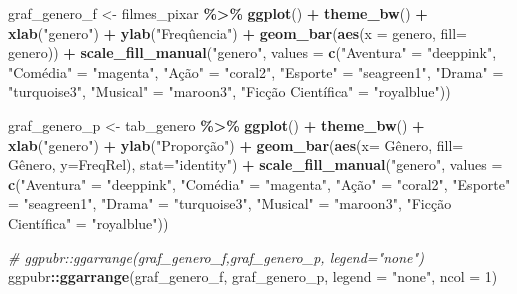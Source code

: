\documentclass[
]{book}
\newenvironment{Shaded}{\begin{snugshade}}{\end{snugshade}}
\newcommand{\AttributeTok}[1]{\textcolor[rgb]{0.13,0.29,0.53}{#1}}
\newcommand{\CommentTok}[1]{\textcolor[rgb]{0.56,0.35,0.01}{\textit{#1}}}
\newcommand{\DecValTok}[1]{\textcolor[rgb]{0.00,0.00,0.81}{#1}}
\newcommand{\FunctionTok}[1]{\textcolor[rgb]{0.13,0.29,0.53}{\textbf{#1}}}
\newcommand{\NormalTok}[1]{#1}
\newcommand{\OtherTok}[1]{\textcolor[rgb]{0.56,0.35,0.01}{#1}}
\newcommand{\SpecialCharTok}[1]{\textcolor[rgb]{0.81,0.36,0.00}{\textbf{#1}}}
\newcommand{\StringTok}[1]{\textcolor[rgb]{0.31,0.60,0.02}{#1}}
\begin{document}
\begin{Shaded}
\begin{Highlighting}[]
\NormalTok{graf\_genero\_f }\OtherTok{\textless{}{-}}\NormalTok{ filmes\_pixar }\SpecialCharTok{\%\textgreater{}\%} 
  \FunctionTok{ggplot}\NormalTok{() }\SpecialCharTok{+} \FunctionTok{theme\_bw}\NormalTok{() }\SpecialCharTok{+} \FunctionTok{xlab}\NormalTok{(}\StringTok{"genero"}\NormalTok{) }\SpecialCharTok{+} \FunctionTok{ylab}\NormalTok{(}\StringTok{"Freqûencia"}\NormalTok{) }\SpecialCharTok{+}
  \FunctionTok{geom\_bar}\NormalTok{(}\FunctionTok{aes}\NormalTok{(}\AttributeTok{x =}\NormalTok{ genero, }\AttributeTok{fill=}\NormalTok{ genero)) }\SpecialCharTok{+} 
  \FunctionTok{scale\_fill\_manual}\NormalTok{(}\StringTok{"genero"}\NormalTok{, }\AttributeTok{values =} \FunctionTok{c}\NormalTok{(}\StringTok{"Aventura"} \OtherTok{=} \StringTok{"deeppink"}\NormalTok{, }
              \StringTok{"Comédia"} \OtherTok{=} \StringTok{"magenta"}\NormalTok{, }\StringTok{"Ação"} \OtherTok{=} \StringTok{"coral2"}\NormalTok{, }
              \StringTok{"Esporte"} \OtherTok{=} \StringTok{"seagreen1"}\NormalTok{, }\StringTok{"Drama"} \OtherTok{=} \StringTok{"turquoise3"}\NormalTok{, }
              \StringTok{"Musical"} \OtherTok{=} \StringTok{"maroon3"}\NormalTok{, }\StringTok{"Ficção Científica"} \OtherTok{=} \StringTok{"royalblue"}\NormalTok{))}

\NormalTok{graf\_genero\_p }\OtherTok{\textless{}{-}}\NormalTok{ tab\_genero }\SpecialCharTok{\%\textgreater{}\%} 
  \FunctionTok{ggplot}\NormalTok{() }\SpecialCharTok{+} \FunctionTok{theme\_bw}\NormalTok{() }\SpecialCharTok{+} \FunctionTok{xlab}\NormalTok{(}\StringTok{"genero"}\NormalTok{) }\SpecialCharTok{+} \FunctionTok{ylab}\NormalTok{(}\StringTok{"Proporção"}\NormalTok{) }\SpecialCharTok{+}
  \FunctionTok{geom\_bar}\NormalTok{(}\FunctionTok{aes}\NormalTok{(}\AttributeTok{x=}\NormalTok{ Gênero, }\AttributeTok{fill=}\NormalTok{ Gênero, }\AttributeTok{y=}\NormalTok{FreqRel), }\AttributeTok{stat=}\StringTok{"identity"}\NormalTok{) }\SpecialCharTok{+} 
  \FunctionTok{scale\_fill\_manual}\NormalTok{(}\StringTok{"genero"}\NormalTok{, }\AttributeTok{values =} \FunctionTok{c}\NormalTok{(}\StringTok{"Aventura"} \OtherTok{=} \StringTok{"deeppink"}\NormalTok{, }
              \StringTok{"Comédia"} \OtherTok{=} \StringTok{"magenta"}\NormalTok{, }\StringTok{"Ação"} \OtherTok{=} \StringTok{"coral2"}\NormalTok{, }
              \StringTok{"Esporte"} \OtherTok{=} \StringTok{"seagreen1"}\NormalTok{, }\StringTok{"Drama"} \OtherTok{=} \StringTok{"turquoise3"}\NormalTok{, }
              \StringTok{"Musical"} \OtherTok{=} \StringTok{"maroon3"}\NormalTok{, }\StringTok{"Ficção Científica"} \OtherTok{=} \StringTok{"royalblue"}\NormalTok{))}

\CommentTok{\# ggpubr::ggarrange(graf\_genero\_f,graf\_genero\_p, legend="none")}
\NormalTok{ggpubr}\SpecialCharTok{::}\FunctionTok{ggarrange}\NormalTok{(graf\_genero\_f, graf\_genero\_p, }\AttributeTok{legend =} \StringTok{"none"}\NormalTok{, }\AttributeTok{ncol =} \DecValTok{1}\NormalTok{)}
\end{Highlighting}
\end{Shaded}
\end{document}
